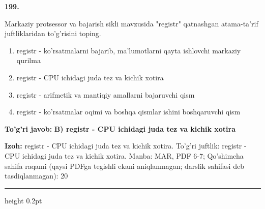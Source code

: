 \documentclass[10pt,a4paper]{article}
\begin{document}
{\bfseries\sffamily\color{ink} 199.}
\par
Markaziy protsessor va bajarish sikli mavzusida "registr" qatnashgan atama-ta'rif juftliklaridan to'g'risini toping.
\begin{enumerate}[label=\Alph*),leftmargin=9mm]
\item registr - ko'rsatmalarni bajarib, ma'lumotlarni qayta ishlovchi markaziy qurilma
\item registr - CPU ichidagi juda tez va kichik xotira
\item registr - arifmetik va mantiqiy amallarni bajaruvchi qism
\item registr - ko'rsatmalar oqimi va boshqa qismlar ishini boshqaruvchi qism
\end{enumerate}
\begin{tcolorbox}[enhanced,breakable,colback=teal!4,colframe=teal!60!black,boxrule=0.45pt,arc=1.2mm,left=2.7mm,right=2.7mm,top=1.8mm,bottom=1.8mm,before skip=2mm,after skip=2mm]
{\bfseries\sffamily\color{teal}To'g'ri javob:} \textbf{B) registr - CPU ichidagi juda tez va kichik xotira}
\par\smallskip
{\bfseries Izoh:} registr - CPU ichidagi juda tez va kichik xotira. To'g'ri juftlik: registr - CPU ichidagi juda tez va kichik xotira. Manba: MAR, PDF 6-7; Qo'shimcha sahifa raqami (qaysi PDFga tegishli ekani aniqlanmagan; darslik sahifasi deb tasdiqlanmagan): 20
\end{tcolorbox}
\vspace{2mm}\hrule height 0.2pt\vspace{3mm}
\end{document}
